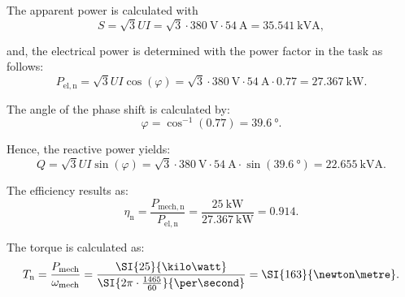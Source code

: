 
\begin{solutionblock}
    The apparent power is calculated with
    \begin{equation}
        S = \sqrt{3} U I
        = \sqrt{3} \cdot \SI{380}{\volt} \cdot \SI{54}{\ampere}
        = \SI{35.541}{\kilo\volt\ampere},
    \end{equation}
    
    and, the electrical power is determined with the power factor in the task as follows:
    \begin{equation}
        P_{\mathrm{el,n}} = \sqrt{3} U I \cos(\varphi)
        = \sqrt{3} \cdot \SI{380}{\volt} \cdot \SI{54}{\ampere} \cdot 0.77
        = \SI{27.367}{\kilo\watt}.
    \end{equation}

    The angle of the phase shift is calculated by:
    \begin{equation}
        \varphi = \cos^{-1}(0.77) = \SI{39.6}{\degree}.
    \end{equation}

    Hence, the reactive power yields:
    \begin{equation}
        Q = \sqrt{3} U I \sin(\varphi)
        = \sqrt{3} \cdot \SI{380}{\volt} \cdot \SI{54}{\ampere} \cdot \sin(\SI{39.6}{\degree})
        = \SI{22.655}{\kilo\volt\ampere}.
    \end{equation}


    The efficiency results as:
    \begin{equation}
        \eta_{\mathrm{n}} = \frac{P_{\mathrm{mech,n}}}{P_{\mathrm{el,n}}} = \frac{\SI{25}{\kilo\watt}}{\SI{27.367}{\kilo\watt}}
        = 0.914.
    \end{equation}
\end{solutionblock}


\begin{solutionblock}
    The torque is calculated as:
    \begin{equation}
        T_{\mathrm{n}} = \frac{P_{\mathrm{mech}}}{\omega_{\mathrm{mech}}}
        = \frac{\SI{25}{\kilo\watt}}{\SI{2\pi\cdot \frac{1465}{60}}{\per \second}}
        = \SI{163}{\newton \metre}.
    \end{equation}
\end{solutionblock}


